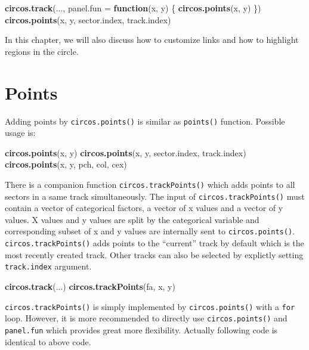 \documentclass[]{book}
\newenvironment{Shaded}{\begin{snugshade}}{\end{snugshade}}
\newcommand{\KeywordTok}[1]{\textcolor[rgb]{0.13,0.29,0.53}{\textbf{#1}}}
\newcommand{\DataTypeTok}[1]{\textcolor[rgb]{0.13,0.29,0.53}{#1}}
\newcommand{\ControlFlowTok}[1]{\textcolor[rgb]{0.13,0.29,0.53}{\textbf{#1}}}
\newcommand{\NormalTok}[1]{#1}
\begin{document}
\begin{Shaded}
\begin{Highlighting}[]
\KeywordTok{circos.track}\NormalTok{(..., }\DataTypeTok{panel.fun =} \ControlFlowTok{function}\NormalTok{(x, y) \{}
    \KeywordTok{circos.points}\NormalTok{(x, y)}
\NormalTok{\})}
\KeywordTok{circos.points}\NormalTok{(x, y, sector.index, track.index)}
\end{Highlighting}
\end{Shaded}

In this chapter, we will also discuss how to customize links and how to
highlight regions in the circle.

\section{Points}\label{points}

Adding points by \texttt{circos.points()} is similar as
\texttt{points()} function. Possible usage is:

\begin{Shaded}
\begin{Highlighting}[]
\KeywordTok{circos.points}\NormalTok{(x, y)}
\KeywordTok{circos.points}\NormalTok{(x, y, sector.index, track.index)}
\KeywordTok{circos.points}\NormalTok{(x, y, pch, col, cex)}
\end{Highlighting}
\end{Shaded}

There is a companion function \texttt{circos.trackPoints()} which adds
points to all sectors in a same track simultaneously. The input of
\texttt{circos.trackPoints()} must contain a vector of categorical
factors, a vector of x values and a vector of y values. X values and y
values are split by the categorical variable and corresponding subset of
x and y values are internally sent to \texttt{circos.points()}.
\texttt{circos.trackPoints()} adds points to the ``current'' track by
default which is the most recently created track. Other tracks can also
be selected by explictly setting \texttt{track.index} argument.

\begin{Shaded}
\begin{Highlighting}[]
\KeywordTok{circos.track}\NormalTok{(...)}
\KeywordTok{circos.trackPoints}\NormalTok{(fa, x, y)}
\end{Highlighting}
\end{Shaded}

\texttt{circos.trackPoints()} is simply implemented by
\texttt{circos.points()} with a \texttt{for} loop. However, it is more
recommended to directly use \texttt{circos.points()} and
\texttt{panel.fun} which provides great more flexibility. Actually
following code is identical to above code.
\end{document}
